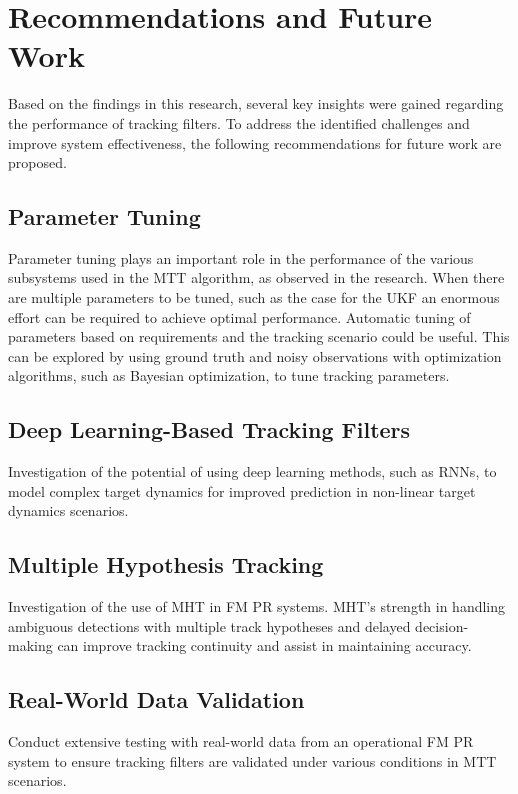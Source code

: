 \section{Recommendations and Future Work}
Based on the findings in this research, several key insights were gained regarding the performance of tracking filters. To address the identified challenges and improve system effectiveness, the following recommendations for future work are proposed.

\subsection{Parameter Tuning}
Parameter tuning plays an important role in the performance of the various subsystems used in the \ac{MTT} algorithm, as observed in the research. When there are multiple parameters to be tuned, such as the case for the \ac{UKF} an enormous effort can be required to achieve optimal performance. Automatic tuning of parameters based on requirements and the tracking scenario could be useful. This can be explored by using ground truth and noisy observations with optimization algorithms, such as Bayesian optimization, to tune tracking parameters.


\subsection{Deep Learning-Based Tracking Filters}
Investigation of the potential of using deep learning methods, such as \ac{RNN}s, to model complex target dynamics for improved prediction in non-linear target dynamics scenarios.

\subsection{Multiple Hypothesis Tracking}
Investigation of the use of \ac{MHT} in \ac{FM} \ac{PR} systems. \ac{MHT}'s strength in handling ambiguous detections with multiple track hypotheses and delayed decision-making can improve tracking continuity and assist in maintaining accuracy.

\subsection{Real-World Data Validation}
Conduct extensive testing with real-world data from an operational \ac{FM} \ac{PR} system to ensure tracking filters are validated under various conditions in \ac{MTT} scenarios.
